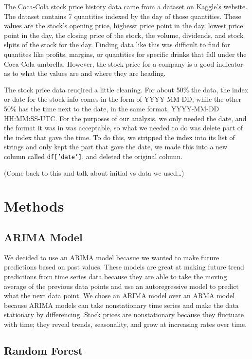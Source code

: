\documentclass[11pt]{article}
\begin{document}
The Coca-Cola stock price history data came from a dataset on Kaggle's website. The dataset contains 7 quantities 
indexed by the day of those quantities. These values are the stock's opening price, highesst price point in the day, 
lowest price point in the day, the closing price of the stock, the volume, dividends, and stock slpits of the 
stock for the day. Finding data like this was difficult to find for quantites like profits, margins, or quantities 
for specific drinks that fall under the Coca-Cola umbrella. However, the stock price for a company is a good indicator 
as to what the values are and where they are heading.\par
The stock price data reuqired a little cleaning. For about 50\% the data, the index or date for the stock info 
comes in the form of YYYY-MM-DD, while the other 50\% has the time next to the date, in the same format, 
YYYY-MM-DD HH:MM:SS-UTC\@. For the purposes of our analysis, we only needed the date, and the format it was in was acceptable, 
so what we needed to do was delete part of the index that gave the time. To do this, we stripped the index 
into its list of strings and only kept the part that gave the date, we made this into a new column called \texttt{df['date']}, 
and deleted the original column.

(Come back to this and talk about initial vs data we used\dots)

\section{Methods}

\subsection{ARIMA Model}

We decided to use an ARIMA model becasue we wanted to make future predictions based on past values. These models are 
great at making future trend predictions from time series data because they are able to take the moving average of 
the previous data points and use an autoregressive model to predict what the next data point. We chose an ARIMA model 
over an ARMA model because ARIMA models can take nonstationary time series and make the data stationary by differencing. 
Stock prices are nonstationary because they fluctuate with time; they reveal trends, seasonality, and grow at increasing 
rates over time. 

\subsection{Random Forest}
\end{document}
